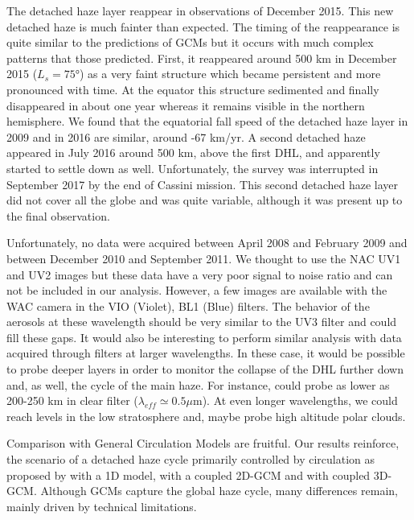 The detached haze layer reappear in observations of December 2015. This new detached haze is much fainter than expected.
The timing of the reappearance is quite similar to the predictions of GCMs but it occurs with much complex patterns
that those predicted. First, it reappeared around 500 km in December 2015 ($L_s =\ang{75}$) as a very faint
structure which became persistent and more pronounced with time. At the equator this structure sedimented and finally disappeared in about one year whereas it remains visible in the northern hemisphere.
We found that the equatorial fall speed of the detached haze layer in 2009 and in 2016 are similar, around -67 km/yr.
A second detached haze appeared in July 2016 around 500 km, above the first DHL, and apparently started to settle down
as well. Unfortunately, the survey was interrupted in September 2017 by the end of Cassini mission. This second detached
haze layer did not cover all the globe and was quite variable, although it was present up to the final observation.

Unfortunately, no data were acquired between April 2008 and February 2009 and between December 2010 and September 2011.
We thought to use the NAC UV1 and UV2 images but these data have a very poor signal to noise ratio and
can not be included in our analysis.
However, a few images are available with the WAC camera in the VIO (Violet), BL1 (Blue) filters.
The behavior of the aerosols at these wavelength should be very similar to the UV3 filter and could fill these gaps.
It would also be interesting to perform similar analysis with data acquired through filters at larger wavelengths.
In these case, it would be possible to probe deeper layers in order to monitor the collapse of the DHL further
down and, as well, the cycle of the main haze. For instance, \cite{Rages1983} could probe as lower as 200-250 km
in clear filter ($\lambda_{eff} \simeq 0.5 \mu$m). At even longer wavelengths, we could reach levels in the low
stratosphere and, maybe probe high altitude polar clouds.

Comparison with General Circulation Models are fruitful. Our results reinforce, the scenario of a
detached haze cycle primarily controlled by circulation as proposed by \cite{Toon1992} with a 1D model, \cite{Rannou2002}
with a coupled 2D-GCM and \cite{Lebonnois2012, Larson2015} with coupled 3D-GCM. Although GCMs capture the global
haze cycle, many differences remain, mainly driven by technical limitations.